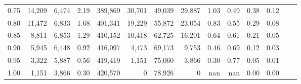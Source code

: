 \begin{tabular}{rrrrrrrrrrrrrr}
0.75 &  14,209 &  6,474 &    2.19 &  389,869 &   30,701 &  49,039 &  29,887 &  1.03 &  0.49 &  0.38 &      0.12 \\
0.80 &  11,472 &  6,833 &    1.68 &  401,341 &   19,229 &  55,872 &  23,054 &  0.83 &  0.55 &  0.29 &      0.08 \\
0.85 &   8,811 &  6,853 &    1.29 &  410,152 &   10,418 &  62,725 &  16,201 &  0.64 &  0.61 &  0.21 &      0.05 \\
0.90 &   5,945 &  6,448 &    0.92 &  416,097 &    4,473 &  69,173 &   9,753 &  0.46 &  0.69 &  0.12 &      0.03 \\
0.95 &   3,322 &  5,887 &    0.56 &  419,419 &    1,151 &  75,060 &   3,866 &  0.30 &  0.77 &  0.05 &      0.01 \\
1.00 &   1,151 &  3,866 &    0.30 &  420,570 &        0 &  78,926 &       0 &   nan &   nan &  0.00 &      0.00 \\
\bottomrule
\end{tabular}
